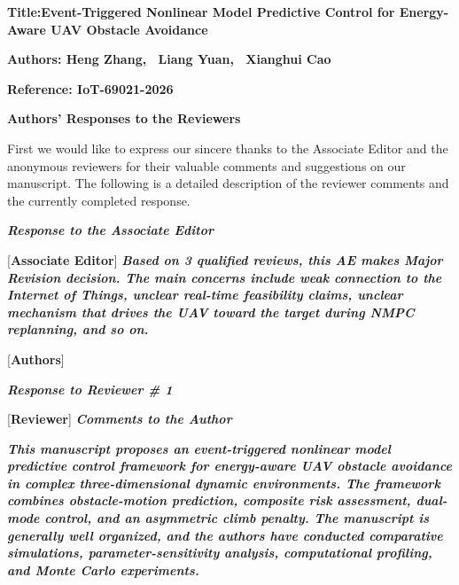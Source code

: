 \documentclass[12pt, twosides]{article}
\theoremstyle{definition}
\begin{document}
\bigskip

\noindent \textbf{Title:Event-Triggered Nonlinear Model Predictive Control for Energy-Aware UAV Obstacle Avoidance}

\noindent \textbf{Authors: Heng Zhang, ~Liang Yuan, ~Xianghui Cao}

\noindent \textbf{Reference:  IoT-69021-2026}

\bigskip

\begin{center}
\textbf{\LARGE Authors' Responses to the Reviewers}
\end{center}

\bigskip First we would like to express our sincere thanks to the Associate Editor and the anonymous reviewers for their valuable comments and suggestions on our manuscript. The following is a detailed description of the reviewer comments and the currently completed response.

\begin{center}
\textbf{\textit{\large Response to the Associate Editor}}
\end{center}

\textcolor[rgb]{0.00,0.00,1.00}{[\textbf {Associate Editor}]} \textit{\textbf{Based on 3 qualified reviews, this AE makes Major Revision decision. The main concerns include weak connection to the Internet of Things, unclear real-time feasibility claims, unclear mechanism that drives the UAV toward the target during NMPC replanning,  and so on.}}

\textcolor[rgb]{0.00,0.00,1.00}{[\textbf{Authors}]}

\begin{center}
\textbf{\textit{\large Response to Reviewer \# 1}}
\end{center}

\textcolor[rgb]{0.00,0.00,1.00}{[\textbf {Reviewer}]} \textit{\textbf{Comments to the Author}}

\textit{\textbf{This manuscript proposes an event-triggered nonlinear model predictive control framework for energy-aware UAV obstacle avoidance in complex three-dimensional dynamic environments. The framework combines obstacle-motion prediction, composite risk assessment, dual-mode control, and an asymmetric climb penalty. The manuscript is generally well organized, and the authors have conducted comparative simulations, parameter-sensitivity analysis, computational profiling, and Monte Carlo experiments.}}
\end{document}
